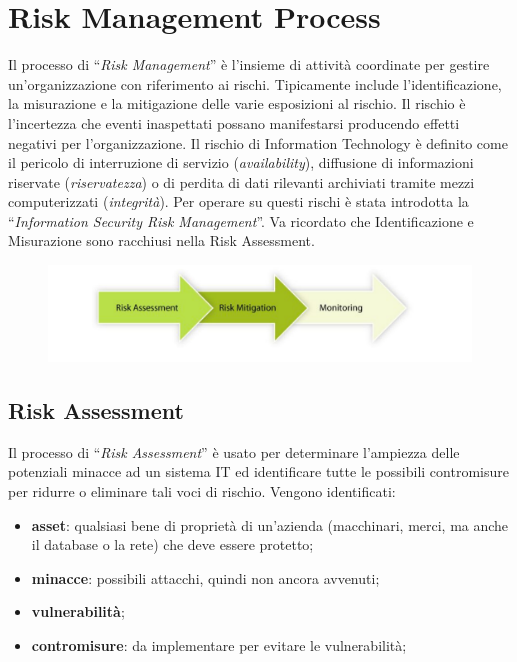 \chapter{Risk Management Process}

Il processo di “\textit{Risk Management}” è l'insieme di attività coordinate
per gestire un'organizzazione con riferimento ai rischi.
Tipicamente include l'identificazione, la misurazione e la mitigazione delle
varie esposizioni al rischio.
Il rischio è l'incertezza che eventi inaspettati possano manifestarsi producendo
effetti negativi per l'organizzazione.
Il rischio di Information Technology è definito come il pericolo di interruzione
di servizio (\textit{availability}), diffusione di informazioni riservate
(\textit{riservatezza}) o di perdita di dati rilevanti
archiviati tramite mezzi computerizzati (\textit{integrità}).
Per operare su questi rischi è stata introdotta la
“\textit{Information Security Risk Management}”.
Va ricordato che Identificazione e Misurazione sono racchiusi nella
Risk Assessment.

\begin{figure}[H]
    \centering
    \includegraphics[width=12cm, keepaspectratio]{capitoli/risks/imgs/risk1.png}
\end{figure}

\section{Risk Assessment}

Il processo di “\textit{Risk Assessment}” è usato per determinare l'ampiezza
delle potenziali minacce ad un sistema IT ed identificare tutte le possibili
contromisure per ridurre o eliminare tali voci di rischio.
Vengono identificati:

\begin{itemize}
    \item \textbf{asset}: qualsiasi bene di proprietà di un'azienda
          (macchinari, merci, ma anche il database o
          la rete) che deve essere protetto;
    \item \textbf{minacce}: possibili attacchi, quindi non ancora avvenuti;
    \item \textbf{vulnerabilità};
    \item \textbf{contromisure}: da implementare per evitare le vulnerabilità;
\end{itemize}

